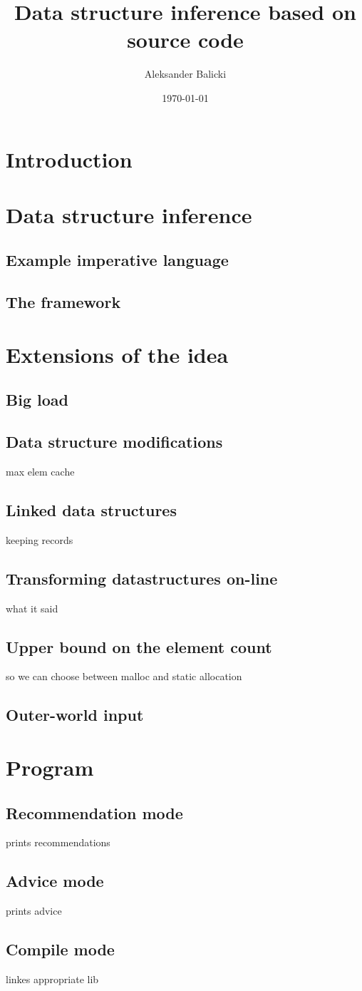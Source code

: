 \documentclass[11pt]{article}
\title{Data structure inference based on source code}
\author{Aleksander Balicki}
\date{\today}
\begin{document}
\maketitle

\begin{abstract}
\end{abstract}

\section{Introduction}

\section{Data structure inference}
	\subsection{Example imperative language}
	\subsection{The framework}
\section{Extensions of the idea}
	\subsection{Big load}
	\subsection{Data structure modifications}
		max elem cache
	\subsection{Linked data structures}
		keeping records
	\subsection{Transforming datastructures on-line}
		what it said
	\subsection{Upper bound on the element count}
	so we can choose between malloc and static allocation
	\subsection{Outer-world input}

\section{Program}
	\subsection{Recommendation mode}
		prints recommendations 
	\subsection{Advice mode}
		prints advice
	\subsection{Compile mode}
		linkes appropriate lib
\end{document}
